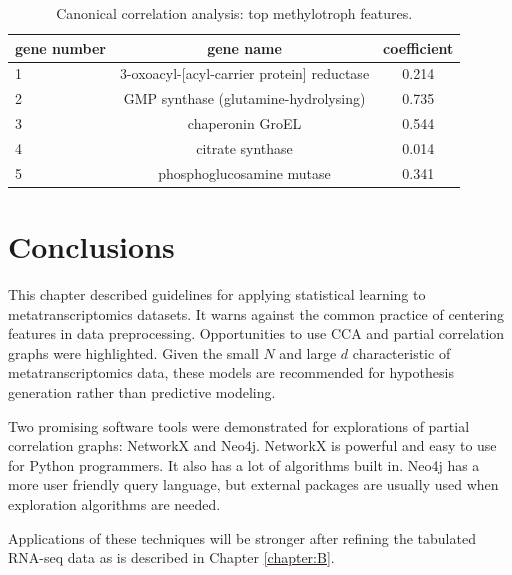 \begin{table}[H]
\centering
\begin{singlespace}
\caption[Canonical correlation analysis: top features]{Canonical correlation analysis: top methylotroph features.}
\begin{tabular}{l | c | c}
          gene number & gene name & coefficient  \\
\midrule
	1 & 3-oxoacyl-[acyl-carrier protein] reductase & 0.214 \\
	2 & GMP synthase (glutamine-hydrolysing) & 0.735 \\
	3 & chaperonin GroEL & 0.544 \\
	4 & citrate synthase & 0.014 \\
	5 & phosphoglucosamine mutase & 0.341 \\
\end{tabular}
\label{table:CCA_methylotroph}
\end{singlespace}
\end{table}

\section{Conclusions}

This chapter described guidelines for applying statistical learning to metatranscriptomics datasets.
It warns against the common practice of centering features in data preprocessing.
Opportunities to use CCA and partial correlation graphs were highlighted.
Given the small $N$ and large $d$ characteristic of metatranscriptomics data, these models are recommended for hypothesis generation rather than predictive modeling.

Two promising software tools were demonstrated for explorations of partial correlation graphs: NetworkX and Neo4j.
NetworkX is powerful and easy to use for Python programmers.  It also has a lot of algorithms built in.
Neo4j has a more user friendly query language, but external packages are usually used when exploration algorithms are needed.

Applications of these techniques will be stronger after refining the tabulated RNA-seq data as is described in Chapter \ref{chapter:B}.

